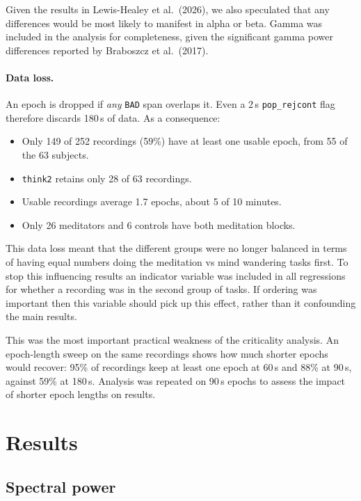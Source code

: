 \documentclass[10pt,a4paper]{article}
\begin{document}
Given the results in Lewis-Healey et al.\ (2026), we also speculated that any differences would be most likely
to manifest in alpha or beta. Gamma was included in the analysis for completeness, given the significant 
gamma power differences reported by Braboszcz et al.\ (2017).

\paragraph{Data loss.} An epoch is dropped if \emph{any} \texttt{BAD} span overlaps it. Even a 2\,s
\texttt{pop\_rejcont} flag therefore discards 180\,s of data. As a consequence:
\begin{itemize}
  \item Only 149 of 252 recordings (59\%) have at least one usable epoch, from 55 of the 63 subjects.
  \item \texttt{think2} retains only 28 of 63 recordings.
  \item Usable recordings average 1.7 epochs, about 5 of 10 minutes.
  \item Only 26 meditators and 6 controls have both meditation blocks. 
\end{itemize}
This data loss meant that the different groups were no longer balanced in terms of having equal numbers
doing the meditation vs mind wandering tasks first. To stop this influencing results an indicator 
variable was included in all regressions for whether a recording was in the second group of tasks.
If ordering was important then this variable should pick up this effect, rather than it confounding the main results.

This was the most important practical weakness of the criticality analysis. An epoch-length sweep on the same
recordings shows how much shorter epochs would recover: 95\% of recordings keep at
least one epoch at 60\,s and 88\% at 90\,s, against 59\% at 180\,s. 
Analysis was repeated on 90\,s epochs to assess the impact of shorter epoch lengths on results.

\section{Results}

\subsection{Spectral power}
\label{sec:power}
\end{document}
